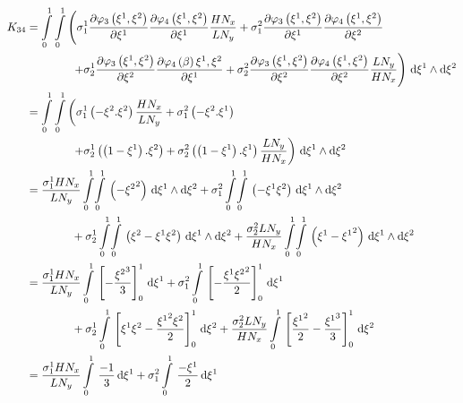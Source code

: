 \begin{equation}
  \begin{aligned}
    K_{34}&=\dintl{0}{1}\dintl{0}{1}\left(
    \conductivitytensorsymbol^{1}_{1}\delby{\lbfn{3}{\xione,\xitwo}}{\xione}
    \delby{\lbfn{4}{\xione,\xitwo}}{\xione}\dfrac{H N_{x}}{L N_{y}}+
    \conductivitytensorsymbol^{2}_{1}\delby{\lbfn{3}{\xione,\xitwo}}{\xione}
    \delby{\lbfn{4}{\xione,\xitwo}}{\xitwo}\right.\\
    &\qquad\qquad\left.+\conductivitytensorsymbol^{1}_{2}\delby{\lbfn{3}{\xione,\xitwo}}{\xitwo}
    \delby{\lbfn{4}{\beta}{\xione,\xitwo}}{\xione}+
    \conductivitytensorsymbol^{2}_{2}\delby{\lbfn{3}{\xione,\xitwo}}{\xitwo}
    \delby{\lbfn{4}{\xione,\xitwo}}{\xitwo}\dfrac{L N_{y}}{H N_{x}}\right)\infinitesimaltwo{\xione}{\xitwo}\\
    &=\dintl{0}{1}\dintl{0}{1}\left(
    \conductivitytensorsymbol^{1}_{1}\pbrac{-\xitwo.\xitwo}\dfrac{H N_{x}}{L N_{y}}+
    \conductivitytensorsymbol^{2}_{1}\pbrac{-\xitwo.\xione}\right.\\
    &\qquad\qquad\left.+\conductivitytensorsymbol^{1}_{2}\pbrac{\pbrac{1-\xione}.\xitwo}+
    \conductivitytensorsymbol^{2}_{2}\pbrac{\pbrac{1-\xione}.\xione}\dfrac{L N_{y}}{H N_{x}}\right)
    \infinitesimaltwo{\xione}{\xitwo}\\
    &=\dfrac{\conductivitytensorsymbol^{1}_{1} H N_{x}}{L N_{y}}\giint{0}{1}{0}{1}{\pbrac{-\xitwosq}}{\xione}{\xitwo}
    +\conductivitytensorsymbol^{2}_{1}\giint{0}{1}{0}{1}{\pbrac{-\xione\xitwo}}{\xione}{\xitwo}\\
    &\qquad\qquad+\conductivitytensorsymbol^{1}_{2}\giint{0}{1}{0}{1}{\pbrac{\xitwo-\xione\xitwo}}{\xione}{\xitwo}
    +\dfrac{\conductivitytensorsymbol^{2}_{2} L N_{y}}{H N_{x}}\giint{0}{1}{0}{1}{\pbrac{\xione-\xionesq}}{\xione}{\xitwo} \\
    &=\dfrac{\conductivitytensorsymbol^{1}_{1} H N_{x}}{L N_{y}}\gint{0}{1}{\sqbrac{-\dfrac{\xitwocube}{3}}^{1}_{0}}{\xione}
    +\conductivitytensorsymbol^{2}_{1}\gint{0}{1}{\sqbrac{-\dfrac{\xione\xitwosq}{2}}^{1}_{0}}{\xione}\\
    &\qquad\qquad+\conductivitytensorsymbol^{1}_{2}\gint{0}{1}{\sqbrac{\xione\xitwo-\dfrac{\xionesq\xitwo}{2}}^{1}_{0}}{\xitwo}
    +\dfrac{\conductivitytensorsymbol^{2}_{2} L N_{y}}{H N_{x}}\gint{0}{1}{\sqbrac{\dfrac{\xionesq}{2}-\dfrac{\xionecube}{3}}^{1}_{0}}{\xitwo} \\
    &=\dfrac{\conductivitytensorsymbol^{1}_{1} H N_{x}}{L N_{y}}\gint{0}{1}{\dfrac{-1}{3}}{\xione}
    +\conductivitytensorsymbol^{2}_{1}\gint{0}{1}{\dfrac{-\xione}{2}}{\xione}

\end{aligned}
\end{equation}
